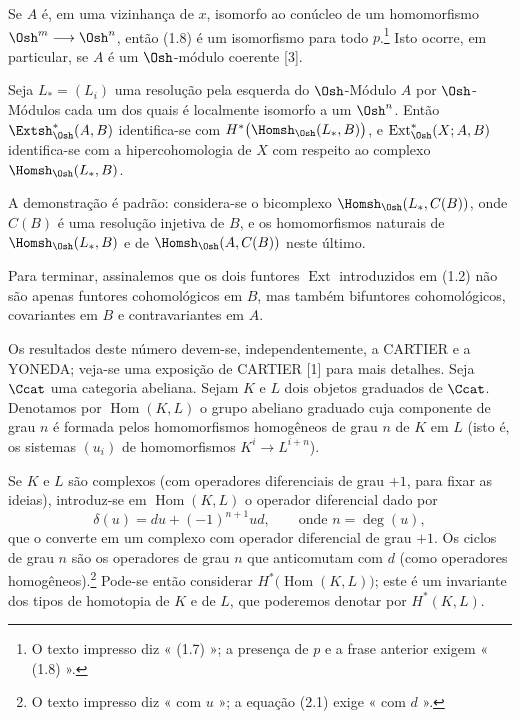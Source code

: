 Se $A$ é, em uma vizinhança de $x$, isomorfo ao
conúcleo de um homomorfismo $\Osh^{m}\longrightarrow\Osh^{n}$, então (1.8) é um
isomorfismo para todo $p$.\footnote{O texto impresso diz « (1.7) »; a
presença de $p$ e a frase anterior exigem « (1.8) ».} Isto ocorre, em
particular, se $A$ é um $\Osh$-módulo coerente [3].

 Seja $L_{*}=(L_i)$ uma resolução pela esquerda do
$\Osh$-Módulo $A$ por $\Osh$-Módulos cada um dos quais é localmente isomorfo a
um $\Osh^{n}$. Então $\Extsh_{\Osh}^{*}(A,B)$ identifica-se com
$H^{*}\bigl(\Homsh_{\Osh}(L_{*},B)\bigr)$, e
$\operatorname{Ext}_{\Osh}^{*}(X;A,B)$ identifica-se com a hipercohomologia de $X$
com respeito ao complexo $\Homsh_{\Osh}(L_{*},B)$.

A demonstração é padrão: considera-se o bicomplexo
$\Homsh_{\Osh}(L_{*},C(B))$, onde $C(B)$ é uma resolução injetiva de $B$, e os
homomorfismos naturais de $\Homsh_{\Osh}(L_{*},B)$ e de
$\Homsh_{\Osh}(A,C(B))$ neste último.

Para terminar, assinalemos que os dois funtores $\operatorname{Ext}$ introduzidos
em (1.2) não são apenas funtores cohomológicos em $B$, mas também
bifuntores cohomológicos, covariantes em $B$ e contravariantes em $A$.


Os resultados deste número devem-se, independentemente, a CARTIER e a YONEDA; veja-se
uma exposição de CARTIER [1] para mais detalhes. Seja $\Ccat$ uma categoria abeliana.
Sejam $K$ e $L$ dois objetos graduados de $\Ccat$. Denotamos por
$\operatorname{Hom}(K,L)$ o grupo abeliano graduado cuja componente de grau
$n$ é formada pelos homomorfismos homogêneos de grau $n$ de $K$ em $L$ (isto é,
os sistemas $(u_i)$ de homomorfismos $K^{i}\longrightarrow L^{i+n}$).

Se $K$ e $L$ são complexos (com operadores diferenciais de grau $+1$, para
fixar as ideias), introduz-se em $\operatorname{Hom}(K,L)$ o operador
diferencial dado por
\begin{equation}\tag{2.1}
  \delta(u)=du+(-1)^{n+1}ud,\qquad\text{onde }n=\deg(u),
\end{equation}
que o converte em um complexo com operador diferencial de grau $+1$. Os ciclos de
grau $n$ são os operadores de grau $n$ que anticomutam com $d$ (como
operadores homogêneos).\footnote{O texto impresso diz « com $u$ »; a equação
(2.1) exige « com $d$ ».} Pode-se então considerar
$H^{*}\bigl(\operatorname{Hom}(K,L)\bigr)$; este é um invariante dos tipos
de homotopia de $K$ e de $L$, que poderemos denotar por $H^{*}(K,L)$.

